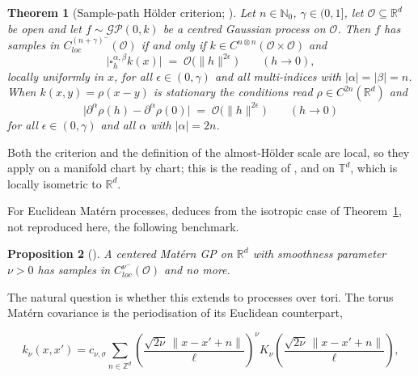 \documentclass[pdflatex,sn-mathphys,Numbered]{sn-jnl}
\theoremstyle{thmstyleone}%
\newtheorem{theorem}{Theorem}[section]%
\newtheorem{proposition}[theorem]{Proposition}%
\theoremstyle{thmstyletwo}%
\theoremstyle{thmstylethree}%
\newcommand{\RR}{\mathbb{R}}
\newcommand{\ZZ}{\mathbb{Z}}
\newcommand{\NN}{\mathbb{N}}
\newcommand{\TT}{\mathbb{T}}
\newcommand{\calO}{\mathcal{O}}
\begin{document}
\begin{theorem}[Sample-path H\"older criterion; {\cite[Theorem~3.1]{path-reg}}]
\label{thm:criterion}
Let $n \in \NN_0$, $\gamma \in (0,1]$, let $\calO \subseteq \RR^d$ be open and
let $f \sim \mathcal{GP}(0,k)$ be a centred Gaussian process on $\calO$. Then
$f$ has samples in $C^{(n+\gamma)^-}_{loc}(\calO)$ if and only if
$k \in C^{n\otimes n}(\calO\times\calO)$ and
\begin{equation}\label{eq:criterion}
    \bigl|\square^{\alpha,\beta}_h k(x)\bigr| \;=\; \calO\bigl(\|h\|^{2\epsilon}\bigr)
    \qquad (h \to 0),
\end{equation}
locally uniformly in $x$, for all $\epsilon \in (0,\gamma)$ and all multi-indices
with $|\alpha| = |\beta| = n$. When $k(x,y) = \rho(x-y)$ is stationary the
conditions read $\rho \in C^{2n}(\RR^d)$ and
\begin{equation}\label{eq:criterion-stat}
    \bigl|\partial^{\alpha}\rho(h) - \partial^{\alpha}\rho(0)\bigr|
    \;=\; \calO\bigl(\|h\|^{2\epsilon}\bigr) \qquad (h\to0)
\end{equation}
for all $\epsilon \in (0,\gamma)$ and all $\alpha$ with $|\alpha| = 2n$.
\end{theorem}

Both the criterion and the definition of the almost-H\"older scale are local, so
they apply on a manifold chart by chart; this is the reading of
\cite[Sec.~3.7]{path-reg}, and on $\TT^d$, which is locally isometric to
$\RR^d$.

For Euclidean Mat\'ern processes, \cite[Proposition~3.1]{path-reg} deduces from
the isotropic case of Theorem~\ref{thm:criterion}, not reproduced here, the
following benchmark.

\begin{proposition}[{\cite[Proposition~3.1]{path-reg}}] \label{euclidean-regularity}
    A centered Mat\'ern GP on $\RR^d$ with smoothness parameter $\nu > 0$ has samples in $C^{\nu^-}_{loc}(\calO)$ and no more.
\end{proposition}

The natural question is whether this extends to processes over tori. The torus
Mat\'ern covariance is the periodisation of its Euclidean counterpart,

\begin{equation}\label{matern-cov}
k_\nu(x,x') = c_{\nu,\sigma} \sum_{n \in \ZZ^d} \left(\frac{\sqrt{2\nu}\,\|x - x' + n\|}{\ell}\right)^\nu K_\nu\left(\frac{\sqrt{2\nu}\,\|x - x' + n\|}{\ell}\right),
\end{equation}
\end{document}
